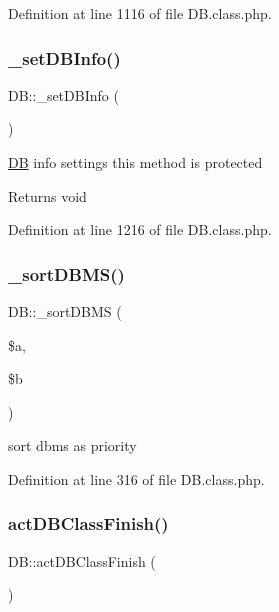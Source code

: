 Definition at line 1116 of file D\+B.\+class.\+php.

\hypertarget{classDB_a92f2478aeb03b00432332ad4e4a3d700}{}\label{classDB_a92f2478aeb03b00432332ad4e4a3d700} 
\subsubsection{\texorpdfstring{\+\_\+set\+D\+B\+Info()}{\_setDBInfo()}}
{\footnotesize\ttfamily D\+B\+::\+\_\+set\+D\+B\+Info (\begin{DoxyParamCaption}{ }\end{DoxyParamCaption})}

\hyperlink{classDB}{DB} info settings this method is protected \begin{DoxyReturn}{Returns}
void 
\end{DoxyReturn}


Definition at line 1216 of file D\+B.\+class.\+php.

\hypertarget{classDB_ab0a6d97fa16de74b4d991c9a4d633718}{}\label{classDB_ab0a6d97fa16de74b4d991c9a4d633718} 
\subsubsection{\texorpdfstring{\+\_\+sort\+D\+B\+M\+S()}{\_sortDBMS()}}
{\footnotesize\ttfamily D\+B\+::\+\_\+sort\+D\+B\+MS (\begin{DoxyParamCaption}\item[{}]{\$a,  }\item[{}]{\$b }\end{DoxyParamCaption})}

sort dbms as priority 

Definition at line 316 of file D\+B.\+class.\+php.

\hypertarget{classDB_abcdbf61ef5e7c96725c7ea2781f165f4}{}\label{classDB_abcdbf61ef5e7c96725c7ea2781f165f4} 
\subsubsection{\texorpdfstring{act\+D\+B\+Class\+Finish()}{actDBClassFinish()}}
{\footnotesize\ttfamily D\+B\+::act\+D\+B\+Class\+Finish (\begin{DoxyParamCaption}{ }\end{DoxyParamCaption})}

